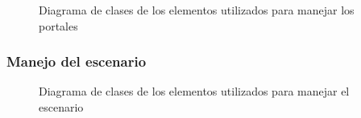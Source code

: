 \documentclass[a4paper]{article}
\begin{document}
\begin{figure}[!h]
	\caption{Diagrama de clases de los elementos utilizados para manejar los portales}
	\label{fig:diagrama3}
\end{figure}


\subsubsection{Manejo del escenario}

\begin{figure}[!h]
	\caption{Diagrama de clases de los elementos utilizados para manejar el escenario}
	\label{fig:diagrama4}
\end{figure}
\end{document}
